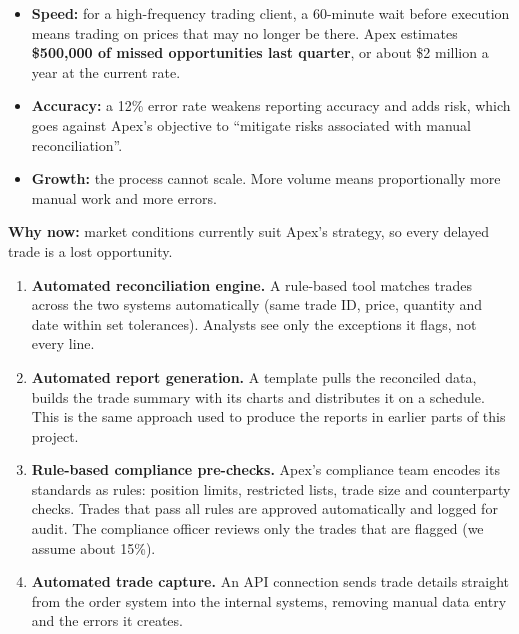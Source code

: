 \documentclass[11pt]{article}
\let\oldsubheading\subheading
\renewcommand{\subheading}[1]{\Needspace{6\baselineskip}\oldsubheading{#1}}
\let\oldheading\heading
\renewcommand{\heading}[1]{\Needspace{8\baselineskip}\oldheading{#1}}
\begin{document}
\begin{itemize}[leftmargin=1.5em, itemsep=2pt]
  \item \textbf{Speed:} for a high-frequency trading client, a 60-minute wait
  before execution means trading on prices that may no longer be there. Apex
  estimates \textbf{\$500,000 of missed opportunities last quarter}, or about
  \$2 million a year at the current rate.
  \item \textbf{Accuracy:} a 12\% error rate weakens reporting accuracy and
  adds risk, which goes against Apex's objective to ``mitigate risks
  associated with manual reconciliation''.
  \item \textbf{Growth:} the process cannot scale. More volume means
  proportionally more manual work and more errors.
\end{itemize}
\textbf{Why now:} market conditions currently suit Apex's strategy, so every
delayed trade is a lost opportunity.


\begin{enumerate}[leftmargin=1.5em, itemsep=4pt]
  \item \textbf{Automated reconciliation engine.} A rule-based tool matches
  trades across the two systems automatically (same trade ID, price, quantity
  and date within set tolerances). Analysts see only the exceptions it flags,
  not every line.
  \item \textbf{Automated report generation.} A template pulls the reconciled
  data, builds the trade summary with its charts and distributes it on a
  schedule. This is the same approach used to produce the reports in earlier
  parts of this project.
  \item \textbf{Rule-based compliance pre-checks.} Apex's compliance team
  encodes its standards as rules: position limits, restricted lists, trade
  size and counterparty checks. Trades that pass all rules are approved
  automatically and logged for audit. The compliance officer reviews only the
  trades that are flagged (we assume about 15\%).
  \item \textbf{Automated trade capture.} An API connection sends trade
  details straight from the order system into the internal systems,
  removing manual data entry and the errors it creates.
\end{enumerate}
\end{document}
